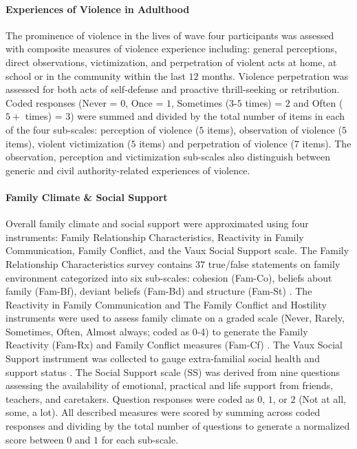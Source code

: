 \documentclass[utf8]{article}
\begin{document}
\paragraph{Experiences of Violence in Adulthood} The prominence of violence in the lives of wave four participants was assessed with composite measures of violence experience including: general perceptions, direct observations, victimization, and perpetration of violent acts at home, at school or in the community within the last $12$ months. Violence perpetration was assessed for both acts of self-defense and proactive thrill-seeking or retribution. Coded responses (Never = $0$, Once = $1$, Sometimes ($3$-$5$ times) = $2$ and Often ($5+$ times) = $3$) were summed and divided by the total number of items in each of the four sub-scales: perception of violence ($5$ items), observation of violence ($5$ items), violent victimization ($5$ items) and perpetration of violence ($7$ items). The observation, perception and victimization sub-scales also distinguish between generic and civil authority-related experiences of violence. 
\paragraph{Family Climate \& Social Support}
Overall family climate and social support were approximated using four instruments: Family Relationship Characteristics, Reactivity in Family Communication, Family Conflict, and the Vaux Social Support scale. The Family Relationship Characteristics survey contains $37$ true/false statements on family environment categorized into six sub-scales: cohesion (Fam-Co), beliefs about family (Fam-Bf), deviant beliefs (Fam-Bd) and structure (Fam-St) \citep{tolan1997assessment}. The Reactivity in Family Communication and The Family Conflict and Hostility instruments were used to assess family climate on a graded scale (Never, Rarely, Sometimes, Often, Almost always; coded as 0-4) to generate the Family Reactivity (Fam-Rx) and Family Conflict measures (Fam-Cf) \citep{thornberry2003gangs,henry2004study}. The Vaux Social Support instrument was collected to gauge extra-familial social health and support status \citep{vaux1988social}. The Social Support scale (SS) was derived from nine questions assessing the availability of emotional, practical and life support from friends, teachers, and caretakers. Question responses were coded as $0$, $1$, or $2$ (Not at all, some, a lot). All described measures were scored by summing across coded responses and dividing by the total number of questions to generate a normalized score between $0$ and $1$ for each sub-scale.
\end{document}
